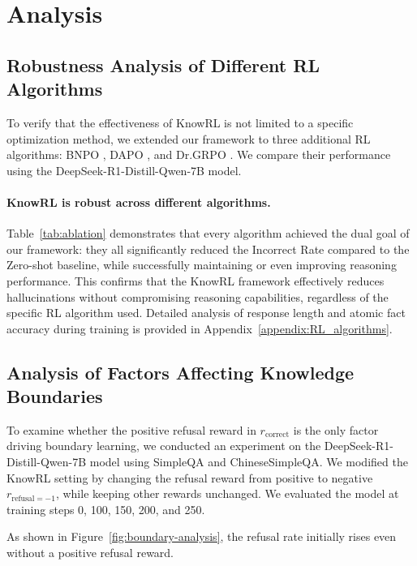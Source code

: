 \section{Analysis}

\subsection{Robustness Analysis of Different RL Algorithms}

To verify that the effectiveness of KnowRL is not limited to a specific optimization method, we extended our framework to three additional RL algorithms: BNPO \cite{xiao2025bnpo}, DAPO \citep{yu2025dapo}, and Dr.GRPO \citep{liu2025understanding}. 
We compare their performance using the DeepSeek-R1-Distill-Qwen-7B model.

\paragraph{KnowRL is robust across different algorithms.} 
Table~\ref{tab:ablation} demonstrates that every algorithm achieved the dual goal of our framework: they all significantly reduced the Incorrect Rate compared to the Zero-shot baseline, while successfully maintaining or even improving reasoning performance. 
This confirms that the KnowRL framework effectively reduces hallucinations without compromising reasoning capabilities, regardless of the specific RL algorithm used. 
Detailed analysis of response length and atomic fact accuracy during training is provided in Appendix~\ref{appendix:RL_algorithms}.







\subsection{Analysis of Factors Affecting Knowledge Boundaries}

To examine whether the positive refusal reward in $r_{\text{correct}}$ is the only factor driving boundary learning, we conducted an experiment on the DeepSeek-R1-Distill-Qwen-7B model using SimpleQA and ChineseSimpleQA. 
We modified the KnowRL setting by changing the refusal reward from positive to negative $r_{\text{refusal}=-1}$, while keeping other rewards unchanged. 
We evaluated the model at training steps 0, 100, 150, 200, and 250.

As shown in Figure~\ref{fig:boundary-analysis}, the refusal rate initially rises even without a positive refusal reward. 

